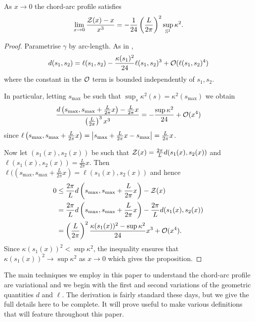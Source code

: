 \documentclass[a4paper, 12pt]{amsart}
\begin{document}
\begin{prop}
\label{prop:asymptotics}
As $x\to 0$ the chord-arc profile satisfies
\[
\lim_{x\to 0} \frac{\operatorname{\mathcal{Z}}(x) - x}{x^3} = - \frac{1}{24}\left(\frac{L}{2\pi}\right)^2 \sup_{\mathbb{S}^1} \kappa^2.
\]
\end{prop}

\begin{proof}
Parametrise $\gamma$ by arc-length. As in \cite{MR2794630}, 
\[
d(s_1, s_2) = \ell(s_1,s_2) - \frac{\kappa(s_1)^2}{24} \ell(s_1,s_2)^3 + \operatorname{\mathcal{O}}(\ell(s_1, s_2)^4)
\]
where the constant in the $\operatorname{\mathcal{O}}$ term is bounded independently of $s_1,s_2$.

In particular, letting $s_{\max}$ be such that $\sup_s \kappa^2(s) = \kappa^2(s_{\max})$ we obtain
\[
\frac{d\left(s_{\max}, s_{\max} + \frac{L}{2\pi} x\right) - \frac{L}{2\pi}x}{\left(\tfrac{L}{2\pi}\right)^3 x^3} = -\frac{\sup \kappa^2}{24} + \operatorname{\mathcal{O}}(x^4)
\]
since $\ell\left(s_{\max}, s_{\max} + \frac{L}{2\pi} x\right) = \left\lvert{s_{\max} + \frac{L}{2\pi} x - s_{\max}}\right\rvert = \frac{L}{2\pi} x$.

Now let $(s_1(x), s_2(x))$ be such that $\operatorname{\mathcal{Z}}(x) = \frac{2\pi}{L} d(s_1(x), s_2(x))$ and $\ell(s_1(x), s_2(x)) = \frac{L}{2\pi} x$. Then $\ell(\left(s_{\max}, s_{\max} + \tfrac{L}{2\pi} x\right) = \ell(s_1(x), s_2(x))$ and hence
\[
\begin{split}
0 &\leq \frac{2\pi}{L}d\left(s_{\max}, s_{\max} + \frac{L}{2\pi}x\right) - \operatorname{\mathcal{Z}}(x) \\
&= \frac{2\pi}{L}d\left(s_{\max}, s_{\max} + \frac{L}{2\pi}x\right) - \frac{2\pi}{L} d(s_1(x), s_2(x)) \\
&= \left(\frac{L}{2\pi}\right)^2 \frac{\kappa(s_1(x))^2 - \sup \kappa^2}{24} x^3 + \operatorname{\mathcal{O}}(x^4).
\end{split}
\]
Since $\kappa(s_1(x))^2 < \sup \kappa^2$, the inequality ensures that $\kappa(s_1(x))^2 \to \sup \kappa^2$ as $x\to 0$ which gives the proposition.
\end{proof}

The main techniques we employ in this paper to understand the chord-arc profile are variational and we begin with the first and second variations of the geometric quantities $d$ and $\ell$. The derivation is fairly standard these days, but we give the full details here to be complete. It will prove useful to make various definitions that will feature throughout this paper.
\end{document}
